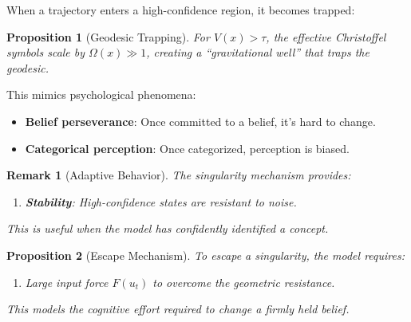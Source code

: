 \documentclass[12pt,letterpaper,twoside]{article}
\newtheorem{remarque}{Remark}[section]
\newtheorem{prop}{Proposition}[section]
\begin{document}
When a trajectory enters a high-confidence region, it becomes trapped:

\begin{prop}[Geodesic Trapping]
For $V(x) > \tau$, the effective Christoffel symbols scale by $\Omega(x) \gg 1$, creating a ``gravitational well'' that traps the geodesic.
\end{prop}

This mimics psychological phenomena:
\begin{itemize}
\item \textbf{Belief perseverance}: Once committed to a belief, it's hard to change.
\item \textbf{Categorical perception}: Once categorized, perception is biased.
\end{itemize}

\begin{remarque}[Adaptive Behavior]
The singularity mechanism provides:
\begin{enumerate}
\item \textbf{Stability}: High-confidence states are resistant to noise.
\end{enumerate}
This is useful when the model has confidently identified a concept.
\end{remarque}

\begin{prop}[Escape Mechanism]
To escape a singularity, the model requires:
\begin{enumerate}
\item Large input force $F(u_t)$ to overcome the geometric resistance.
\end{enumerate}
This models the cognitive effort required to change a firmly held belief.
\end{prop}
\end{document}
